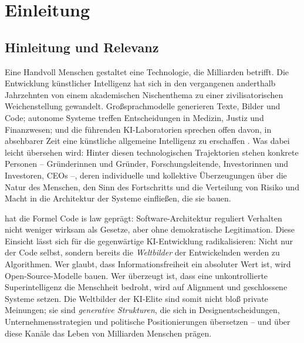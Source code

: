 \documentclass[12pt,a4paper]{article}
\begin{document}
\section{Einleitung}
\label{sec:einleitung}

\subsection{Hinleitung und Relevanz}
\label{sec:einleitung:relevanz}

Eine Handvoll Menschen gestaltet eine Technologie, die Milliarden betrifft. Die Entwicklung k\"unstlicher Intelligenz hat sich in den vergangenen anderthalb Jahrzehnten von einem akademischen Nischenthema zu einer zivilisatorischen Weichenstellung gewandelt. Gro\ss{}sprachmodelle generieren Texte, Bilder und Code; autonome Systeme treffen Entscheidungen in Medizin, Justiz und Finanzwesen; und die f\"uhrenden KI-Laboratorien sprechen offen davon, in absehbarer Zeit eine k\"unstliche allgemeine Intelligenz zu erschaffen \citep{OpenAI2023Charter, AnthropicCoreViews2023, Bengio2024}. Was dabei leicht \"ubersehen wird: Hinter diesen technologischen Trajektorien stehen konkrete Personen -- Gr\"underinnen und Gr\"under, Forschungsleitende, Investorinnen und Investoren, CEOs --, deren individuelle und kollektive \"Uberzeugungen \"uber die Natur des Menschen, den Sinn des Fortschritts und die Verteilung von Risiko und Macht in die Architektur der Systeme einflie\ss{}en, die sie bauen.

\citet{Lessig1999} hat die Formel \glqq Code is law\grqq{} gepr\"agt: Software-Architektur reguliert Verhalten nicht weniger wirksam als Gesetze, aber ohne demokratische Legitimation. Diese Einsicht l\"asst sich f\"ur die gegenw\"artige KI-Entwicklung radikalisieren: Nicht nur der Code selbst, sondern bereits die \emph{Weltbilder} der Entwickelnden werden zu Algorithmen. Wer glaubt, dass Informationsfreiheit ein absoluter Wert ist, wird Open-Source-Modelle bauen. Wer \"uberzeugt ist, dass eine unkontrollierte Superintelligenz die Menschheit bedroht, wird auf Alignment und geschlossene Systeme setzen. Die Weltbilder der KI-Elite sind somit nicht blo\ss{} private Meinungen; sie sind \emph{generative Strukturen}, die sich in Designentscheidungen, Unternehmensstrategien und politische Positionierungen \"ubersetzen -- und \"uber diese Kan\"ale das Leben von Milliarden Menschen pr\"agen.
\end{document}
